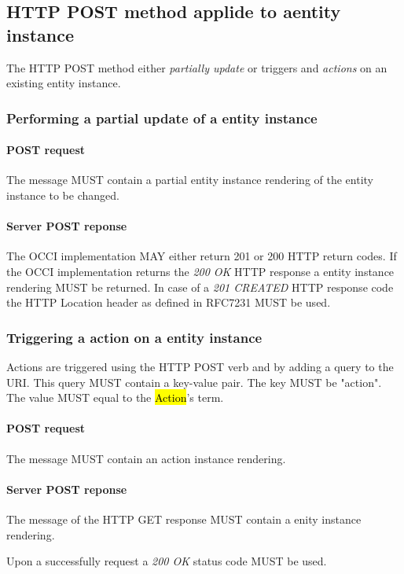 \documentclass[10pt,a4paper]{article}
\begin{document}
\subsection{HTTP POST method applide to aentity instance}
The HTTP POST method either {\em partially update} or triggers and {\em actions} on an existing entity instance.

\subsubsection{Performing a partial update of a entity instance}

\paragraph{POST request}
The message MUST contain a partial entity instance rendering of the entity instance to be changed.

\paragraph{Server POST reponse}
The OCCI implementation MAY either return 201 or 200 HTTP return codes. If the OCCI implementation
returns the \emph{200 OK} HTTP response a entity instance rendering MUST be returned. 
In case of a \emph{201 CREATED} HTTP response code the HTTP Location header as defined in RFC7231 \cite{rfc7231} MUST be used.

\subsubsection{Triggering a action on a entity instance}
Actions are triggered using the HTTP POST verb and by adding a query to the URI. This query MUST contain a key-value pair. The key MUST be "action". The value MUST equal to the \hl{Action}'s term.

\paragraph{POST request}
The message MUST contain an action instance rendering.

\paragraph{Server POST reponse}
The message of the HTTP GET response MUST contain a enity instance rendering.

Upon a successfully request a \emph{200 OK} status code MUST be used.
\end{document}
